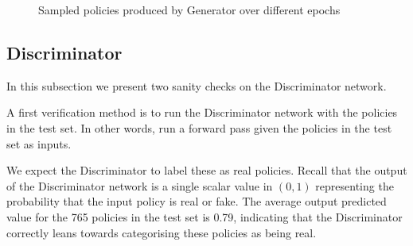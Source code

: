 \begin{figure}
{\hskip 2cm
\vskip 0.5cm
\hskip 2cm
}
\caption{Sampled policies produced by Generator over different epochs}
\label{fig:sampled_policies}
\vskip -2mm
\end{figure}

\subsection{Discriminator}
In this subsection we present two sanity checks on the Discriminator network.

A first verification method is to run the Discriminator network with the policies in the test set. In other words, run a forward pass given the policies in the test set as inputs.

We expect the Discriminator to label these as real policies. Recall that the output of the Discriminator network is a single scalar value in $(0,1)$ representing the probability that the input policy is real or fake. The average output predicted value for the 765 policies in the test set is 0.79, indicating that the Discriminator correctly leans towards categorising these policies as being real.

